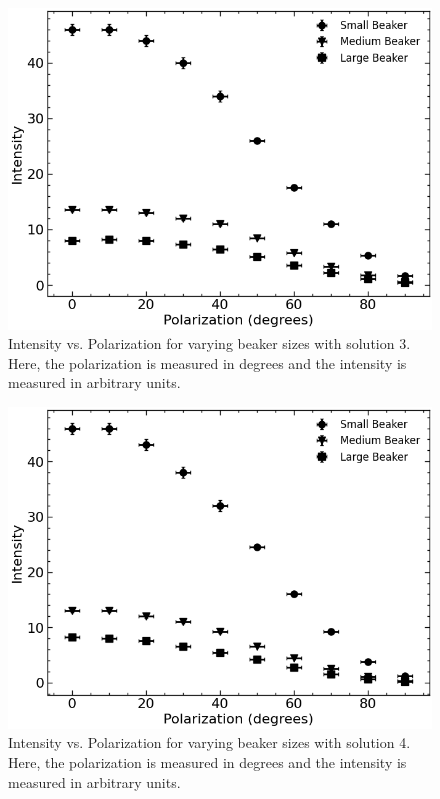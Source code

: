 \begin{figure}[H]
    \begin{center}
        \includegraphics[width=\columnwidth]{../figures/solution3.png}
    \end{center}
    \caption{Intensity vs. Polarization for varying beaker sizes with solution 3. Here, the polarization is measured in degrees and the intensity is measured in arbitrary units.}
    \label{fig:solution3}
\end{figure}

\begin{figure}[H]
    \begin{center}
        \includegraphics[width=\columnwidth]{../figures/solution4.png}
    \end{center}
    \caption{Intensity vs. Polarization for varying beaker sizes with solution 4. Here, the polarization is measured in degrees and the intensity is measured in arbitrary units.}
    \label{fig:solution4}
\end{figure}

